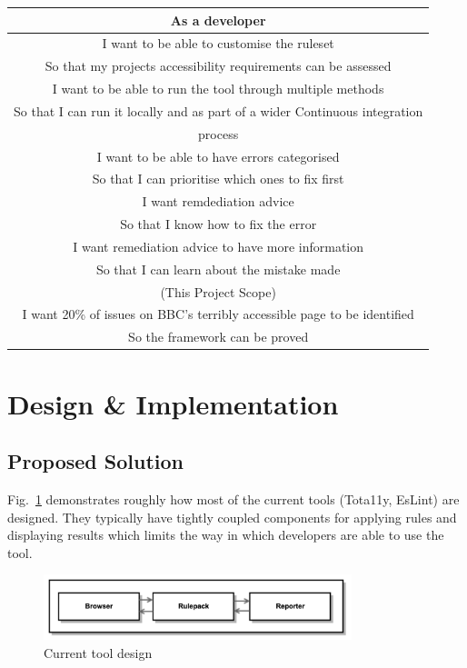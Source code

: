 \begin{center}
 \begin{tabular}{| c |}
 \hline
 As a developer \\
 \hline
 I want to be able to customise the ruleset \\
 So that my projects accessibility requirements can be assessed \\
 \hline
 I want to be able to run the tool through multiple methods \\
 So that I can run it locally and as part of a wider Continuous integration \\
 process \\
 \hline
 I want to be able to have errors categorised \\
 So that I can prioritise which ones to fix first \\
 \hline
 I want remdediation advice \\
 So that I know how to fix the error \\
 \hline
 I want remediation advice to have more information \\
 So that I can learn about the mistake made \\
 \hline
 (This Project Scope) \\
 I want 20\% of issues on BBC's terribly accessible page to be identified \\
 So the framework can be proved \\
 \hline
\end{tabular}
\end{center}

\section{Design \& Implementation}
\subsection{Proposed Solution}
Fig.~\ref{fig:tool_current_design} demonstrates roughly how most of
the current tools (Tota11y, EsLint) are designed. They typically have tightly
coupled components for applying rules and displaying results which limits the
way in which developers are able to use the tool.

\begin{figure}[H]
\centering
\includegraphics[width=0.8\textwidth]{figures/a11y_tool_current_design}
\captionsetup{justification=centering}
\caption{Current tool design
\label{fig:tool_current_design}}
\end{figure}

